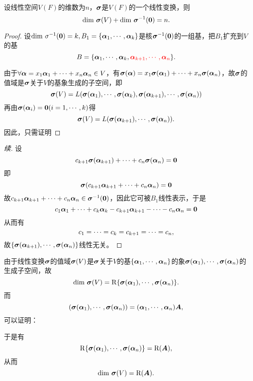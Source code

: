\begin{frame}
  \begin{dingli}
    设线性空间$V(F)$的维数为$n$，$\boldsymbol{\sigma}$是$V(F)$的一个线性变换，则
    $$
    \dim \sigmabd(V)+\dim \sigmabd^{-1}(\M0)=n.
    $$
  \end{dingli}\vspace{.1in}\pause 

  \begin{proof}
    设$\dim \sigma^{-1}(\M0)=k, B_1=\{\alphabd_1,\cd,\alphabd_k\}$是核$\sigmabd^{-1}(\M0)$的一组基，把$B_1$扩充到$V$的基
    $$
    B=\{\boldsymbol{\alpha}_1,\cdots,\boldsymbol{\alpha}_k,\textcolor{red}{\boldsymbol{\alpha}_{k+1},\cdots,\boldsymbol{\alpha}_n}\}.
    $$\vspace{.1in}\pause 
    
    由于$\forall \boldsymbol{\alpha}=x_1\boldsymbol{\alpha}_1+\cdots+x_n\boldsymbol{\alpha}_n\in V$，有$\boldsymbol{\sigma}(\boldsymbol{\alpha})=x_1\boldsymbol{\sigma}(\boldsymbol{\alpha}_1)+\cdots+x_n\boldsymbol{\sigma}(\boldsymbol{\alpha}_n)$，故$\boldsymbol{\sigma}$的值域是$\boldsymbol{\sigma}$关于$V$的基象生成的子空间，即
    $$
    \boldsymbol{\sigma}(V)=L(\boldsymbol{\sigma}(\boldsymbol{\alpha}_1),\cdots,\boldsymbol{\sigma}(\boldsymbol{\alpha}_k),\boldsymbol{\sigma}(\boldsymbol{\alpha}_{k+1}),\cdots,\boldsymbol{\sigma}(\boldsymbol{\alpha}_n))
    $$
    再由$\sigmabd(\alphabd_i)=\M0(i=1,\cd,k)$得
    $$
    \boldsymbol{\sigma}(V)=L(\boldsymbol{\sigma}(\boldsymbol{\alpha}_{k+1}),\cdots,\boldsymbol{\sigma}(\boldsymbol{\alpha}_n)).
    $$
    因此，只需证明
  \end{proof}
  
\end{frame}

\begin{frame}
  \begin{proof}[续]
    设
    $$
    c_{k+1}\sigmabd(\alphabd_{k+1})+\cd+c_n\sigmabd(\alphabd_n)=\M0
    $$
    即
    $$
    \sigmabd(c_{k+1}\alphabd_{k+1}+\cd+c_n\alphabd_n)=\M0
    $$
    故$c_{k+1}\alphabd_{k+1}+\cd+c_n\alphabd_n\in \sigmabd^{-1}(\M0)$，因此它可被$B_1$线性表示，于是
    $$
    c_1\alphabd_1+\cd+c_k\alphabd_k-c_{k+1}\alphabd_{k+1}-\cd-c_n\alphabd_n=\M0
    $$
    从而有
    $$
    c_1=\cdots=c_k=c_{k+1}=\cdots=c_n,
    $$
    故$\{\boldsymbol{\sigma}(\boldsymbol{\alpha}_{k+1}),\cdots,\boldsymbol{\sigma}(\boldsymbol{\alpha}_n)\}$线性无关。

  \end{proof}
  
\end{frame}

\begin{frame}
  由于线性变换$\boldsymbol{\sigma}$的值域$\boldsymbol{\sigma}(V)$是$\boldsymbol{\sigma}$关于$V$的基$\{\boldsymbol{\alpha}_1,\cdots,\boldsymbol{\alpha}_n\}$的象$\boldsymbol{\sigma}(\boldsymbol{\alpha}_1),\cdots,\boldsymbol{\sigma}(\boldsymbol{\alpha}_n)$的生成子空间，故
  $$
  \mathrm{dim~} \boldsymbol{\sigma}(V) = \mathrm{R}\{\boldsymbol{\sigma}(\boldsymbol{\alpha}_1),\cdots,\boldsymbol{\sigma}(\boldsymbol{\alpha}_n)\}.
  $$\pause 
  而
  $$
  (\boldsymbol{\sigma}(\boldsymbol{\alpha}_1),\cdots,\boldsymbol{\sigma}(\boldsymbol{\alpha}_n))=(\boldsymbol{\alpha}_1,\cdots,\boldsymbol{\alpha}_n)\boldsymbol{A},
  $$
  可以证明： \pause 

  于是有
  $$
  \mathrm{R}\{\boldsymbol{\sigma}(\boldsymbol{\alpha}_1),\cdots,\boldsymbol{\sigma}(\boldsymbol{\alpha}_n)\}=\mathrm{R}(\boldsymbol{A}),
  $$
  从而
  $$
  \mathrm{dim~} \boldsymbol{\sigma}(V) = \mathrm{R}(\boldsymbol{A}).
  $$

\end{frame}

